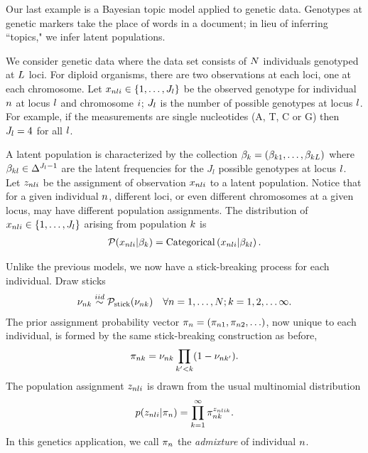 
Our last example is a Bayesian topic model applied to genetic data.
Genotypes at genetic markers take the place of
words in a document; in lieu of inferring ``topics," we infer latent populations.

\begin{ex}

We consider genetic data where the
data set consists of $N$ individuals genotyped at $L$ loci.
For diploid organisms, there are two observations at each loci, one at each chromosome.
Let $x_{nli}\in\{1, \ldots, J_l\}$ be the observed genotype for
individual $n$ at locus $l$ and chromosome $i$;
$J_l$ is the number of possible genotypes at locus $l$.
For example, if the measurements are single nucleotides (A, T, C or G)
then $J_l = 4$ for all $l$.

A latent population is characterized by the collection
$\beta_k = (\beta_{k1}, \ldots, \beta_{kL})$ where
$\beta_{kl}\in\Delta^{J_l - 1}$ are the latent frequencies for the $J_l$
possible genotypes at locus $l$.
Let $z_{nli}$ be the assignment of observation $x_{nli}$ to a latent population.
Notice that for a given individual $n$,
different loci, or even different chromosomes at a given locus,
may have different population assignments.
The distribution of $x_{nli}\in\{1, \ldots, J_l\}$ arising from population $k$ is
\begin{align*}
\mathcal{P}(x_{nli} \vert \beta_{k}) =
\mathrm{Categorical}\left(x_{nli}\vert \beta_{kl}\right).
\end{align*}


Unlike the previous models, we now have a stick-breaking process for each individual.
Draw sticks
\begin{align*}
\nu_{nk} \overset{iid}{\sim} \mathcal{P}_{\mathrm{stick}}(\nu_{nk}) \quad \forall n = 1, \ldots, N; k = 1, 2, \ldots \infty.
\end{align*}
The prior assignment probability vector
$\pi_{n} = (\pi_{n1}, \pi_{n2}, \ldots)$,
now unique to each individual,
is formed by the same stick-breaking construction as before,
%
\begin{align*}
\pi_{nk} = \nu_{nk} \prod_{k' < k} (1 - \nu_{nk'}).
\end{align*}
%
The population assignment $z_{nli}$
is drawn from the
usual multinomial distribution
%
\begin{align*}
p(z_{nli} | \pi_n) = \prod_{k=1}^{\infty} \pi_{nk}^{z_{nlik}}.
\end{align*}
%
In this genetics application,
we call $\pi_{n}$ the
\textit{admixture} of individual $n$.



\end{ex}
